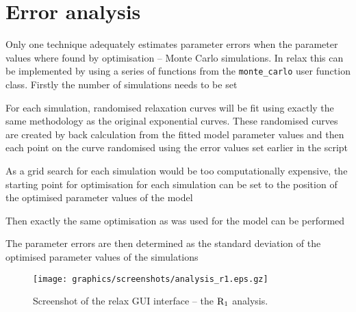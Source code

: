 



\section{Error analysis}

Only one technique adequately estimates parameter errors when the parameter values where found by optimisation -- Monte Carlo simulations.  In relax this can be implemented by using a series of functions from the \texttt{monte\_carlo} user function class.  Firstly the number of simulations needs to be set


For each simulation, randomised relaxation curves will be fit using exactly the same methodology as the original exponential curves.  These randomised curves are created by back calculation from the fitted model parameter values and then each point on the curve randomised using the error values set earlier in the script


As a grid search for each simulation would be too computationally expensive, the starting point for optimisation for each simulation can be set to the position of the optimised parameter values of the model


Then exactly the same optimisation as was used for the model can be performed


The parameter errors are then determined as the standard deviation of the optimised parameter values of the simulations



\begin{figure}
\centerline{\texttt{[image: graphics/screenshots/analysis\_r1.eps.gz]}}
\caption[GUI screenshot -- $\Rone$ analysis]{Screenshot of the relax GUI interface -- the $\Rone$ analysis.}\label{fig: screenshot: R1 analysis}
\end{figure}



